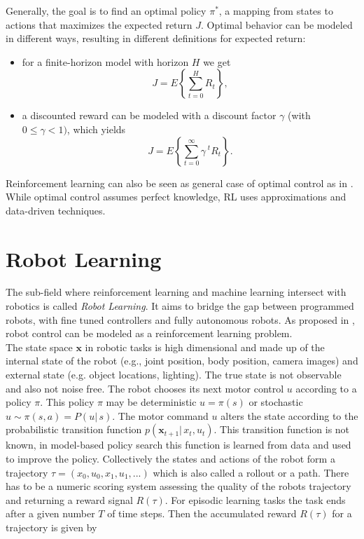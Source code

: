 Generally, the goal is to find an optimal policy $\pi^*$,
a mapping from states to actions that
maximizes the expected return $J$.
Optimal behavior can be modeled in
different ways, resulting in different
definitions for expected return:
\begin{itemize}
\item for a finite-horizon model with horizon $H$ we get
$$ J = E \left\{\sum^H_{t=0} R_t \right\}, $$

\item a discounted reward can be modeled with
  a discount factor $\gamma$ (with $0 \leq \gamma < 1)$, which yields
$$ J = E \left\{\sum^{\infty}_{t=0} \gamma^{\; t} R_t \right\}. $$
\end{itemize}

Reinforcement learning can also be seen as
general case of optimal control as in \citet{sutton1992reinforcement}.
While optimal control assumes perfect knowledge, RL uses approximations
and data-driven techniques.



\section{Robot Learning}
The sub-field where reinforcement learning and machine learning
intersect with robotics is called \textit{Robot Learning}. It aims to bridge
the gap between programmed robots,
with fine tuned controllers  and fully autonomous robots.
As proposed in \citet{deisenroth2013survey}, robot control can be modeled as
a reinforcement learning problem. \\
The state space $\mathbf{x}$ in robotic tasks is high dimensional and
made up of
the internal state of the robot (e.g., joint position, body position,
camera images)
and external state (e.g. object locations, lighting). The true state is
not observable and also not noise free. 
The robot chooses its next motor control $u$ according to a policy $\pi$.
This policy $\pi$ may
be deterministic $u = \pi(s)$ or stochastic $u \sim \pi(s,a) = P(u |\, s)$.
The motor command $u$ alters the state according to the probabilistic
transition function $p(\mathbf{x}_{t+1} |\, x_t, u_t)$. This transition function
is not known, in model-based policy search this function is learned from data and
used to improve the policy.
Collectively the states and actions of the robot form a
trajectory $\tau = (x_0, u_0, x_1, u_1,...)$ which is also called
a rollout or a path.
There has to be a numeric scoring system assessing the quality
of the robots trajectory and returning a reward signal $R(\tau)$.
For episodic learning tasks the task ends after a given number $T$ of time
steps. Then the accumulated reward $R(\tau)$ for a trajectory is given by

